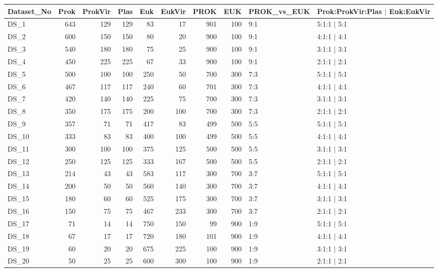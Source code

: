 \begin{table}[ht]
\centering
\begin{tabular}{lrrrrrrrll}
  \hline
Dataset\_No & Prok & ProkVir & Plas & Euk & EukVir & PROK & EUK & PROK\_vs\_EUK & Prok:ProkVir:Plas $|$ Euk:EukVir \\ 
  \hline
DS\_1 & 643 & 129 & 129 &  83 &  17 & 901 & 100 & 9:1 & 5:1:1 $|$ 5:1 \\ 
  DS\_2 & 600 & 150 & 150 &  80 &  20 & 900 & 100 & 9:1 & 4:1:1 $|$ 4:1 \\ 
  DS\_3 & 540 & 180 & 180 &  75 &  25 & 900 & 100 & 9:1 & 3:1:1 $|$ 3:1 \\ 
  DS\_4 & 450 & 225 & 225 &  67 &  33 & 900 & 100 & 9:1 & 2:1:1 $|$ 2:1 \\ 
  DS\_5 & 500 & 100 & 100 & 250 &  50 & 700 & 300 & 7:3 & 5:1:1 $|$ 5:1 \\ 
  DS\_6 & 467 & 117 & 117 & 240 &  60 & 701 & 300 & 7:3 & 4:1:1 $|$ 4:1 \\ 
  DS\_7 & 420 & 140 & 140 & 225 &  75 & 700 & 300 & 7:3 & 3:1:1 $|$ 3:1 \\ 
  DS\_8 & 350 & 175 & 175 & 200 & 100 & 700 & 300 & 7:3 & 2:1:1 $|$ 2:1 \\ 
  DS\_9 & 357 &  71 &  71 & 417 &  83 & 499 & 500 & 5:5 & 5:1:1 $|$ 5:1 \\ 
  DS\_10 & 333 &  83 &  83 & 400 & 100 & 499 & 500 & 5:5 & 4:1:1 $|$ 4:1 \\ 
  DS\_11 & 300 & 100 & 100 & 375 & 125 & 500 & 500 & 5:5 & 3:1:1 $|$ 3:1 \\ 
  DS\_12 & 250 & 125 & 125 & 333 & 167 & 500 & 500 & 5:5 & 2:1:1 $|$ 2:1 \\ 
  DS\_13 & 214 &  43 &  43 & 583 & 117 & 300 & 700 & 3:7 & 5:1:1 $|$ 5:1 \\ 
  DS\_14 & 200 &  50 &  50 & 560 & 140 & 300 & 700 & 3:7 & 4:1:1 $|$ 4:1 \\ 
  DS\_15 & 180 &  60 &  60 & 525 & 175 & 300 & 700 & 3:7 & 3:1:1 $|$ 3:1 \\ 
  DS\_16 & 150 &  75 &  75 & 467 & 233 & 300 & 700 & 3:7 & 2:1:1 $|$ 2:1 \\ 
  DS\_17 &  71 &  14 &  14 & 750 & 150 &  99 & 900 & 1:9 & 5:1:1 $|$ 5:1 \\ 
  DS\_18 &  67 &  17 &  17 & 720 & 180 & 101 & 900 & 1:9 & 4:1:1 $|$ 4:1 \\ 
  DS\_19 &  60 &  20 &  20 & 675 & 225 & 100 & 900 & 1:9 & 3:1:1 $|$ 3:1 \\ 
  DS\_20 &  50 &  25 &  25 & 600 & 300 & 100 & 900 & 1:9 & 2:1:1 $|$ 2:1 \\ 
   \hline
\end{tabular}
\end{table}
